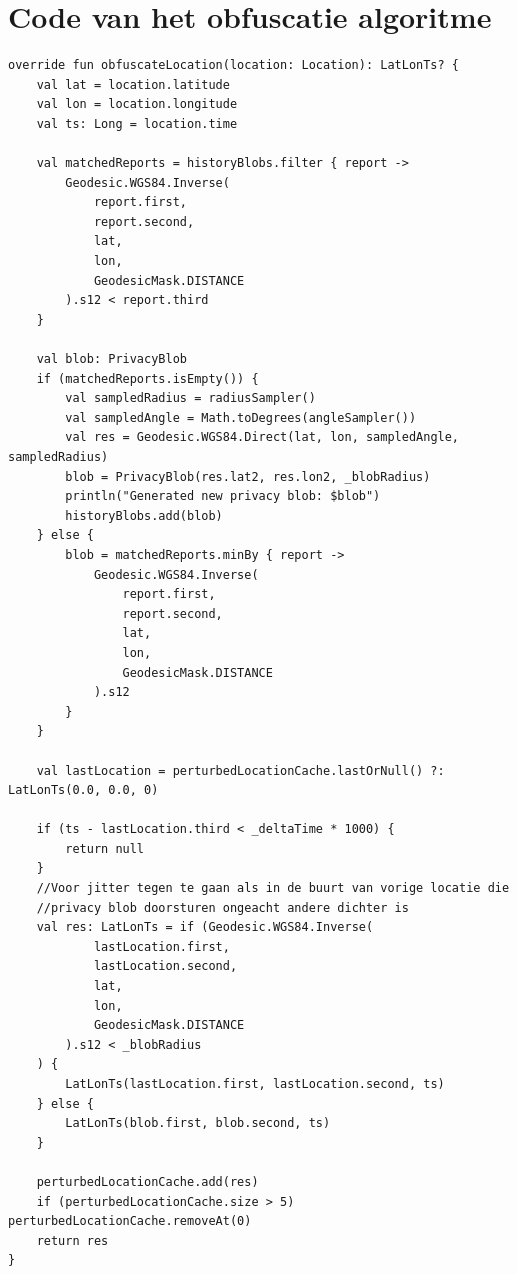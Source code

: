 \chapter{Code van het obfuscatie algoritme}
\begin{verbatim}
override fun obfuscateLocation(location: Location): LatLonTs? {
    val lat = location.latitude
    val lon = location.longitude
    val ts: Long = location.time

    val matchedReports = historyBlobs.filter { report ->
        Geodesic.WGS84.Inverse(
            report.first,
            report.second,
            lat,
            lon,
            GeodesicMask.DISTANCE
        ).s12 < report.third
    }

    val blob: PrivacyBlob
    if (matchedReports.isEmpty()) {
        val sampledRadius = radiusSampler()
        val sampledAngle = Math.toDegrees(angleSampler())
        val res = Geodesic.WGS84.Direct(lat, lon, sampledAngle, sampledRadius)
        blob = PrivacyBlob(res.lat2, res.lon2, _blobRadius)
        println("Generated new privacy blob: $blob")
        historyBlobs.add(blob)
    } else {
        blob = matchedReports.minBy { report ->
            Geodesic.WGS84.Inverse(
                report.first,
                report.second,
                lat,
                lon,
                GeodesicMask.DISTANCE
            ).s12
        }
    }

    val lastLocation = perturbedLocationCache.lastOrNull() ?: LatLonTs(0.0, 0.0, 0)

    if (ts - lastLocation.third < _deltaTime * 1000) {
        return null
    }
    //Voor jitter tegen te gaan als in de buurt van vorige locatie die 
    //privacy blob doorsturen ongeacht andere dichter is
    val res: LatLonTs = if (Geodesic.WGS84.Inverse(
            lastLocation.first,
            lastLocation.second,
            lat,
            lon,
            GeodesicMask.DISTANCE
        ).s12 < _blobRadius
    ) {
        LatLonTs(lastLocation.first, lastLocation.second, ts)
    } else {
        LatLonTs(blob.first, blob.second, ts)
    }

    perturbedLocationCache.add(res)
    if (perturbedLocationCache.size > 5) perturbedLocationCache.removeAt(0)
    return res
}
\end{verbatim}
